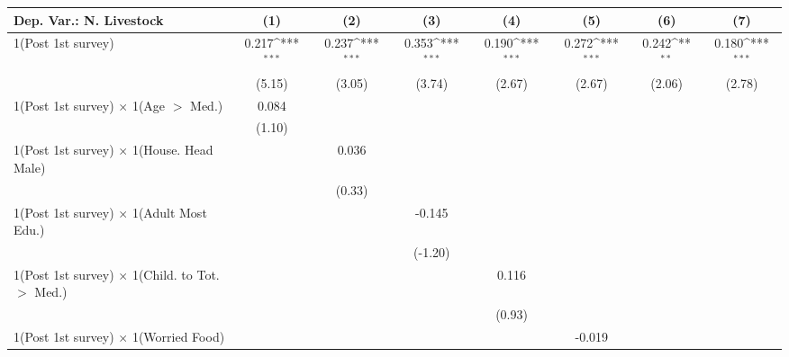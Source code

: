 {
\def\sym#1{\ifmmode^{#1}\else\(^{#1}\)\fi}
\begin{tabular*}{\hsize}{@{\hskip\tabcolsep\extracolsep\fill}l*{7}{c}}
\toprule
Dep. Var.: N. Livestock&      (1)         &      (2)         &      (3)         &      (4)         &      (5)         &      (6)         &      (7)         \\
\midrule
1(Post 1st survey)&    0.217\sym{***}&    0.237\sym{***}&    0.353\sym{***}&    0.190\sym{***}&    0.272\sym{***}&    0.242\sym{**} &    0.180\sym{***}\\
                &   (5.15)         &   (3.05)         &   (3.74)         &   (2.67)         &   (2.67)         &   (2.06)         &   (2.78)         \\
1(Post 1st survey) $\times$ 1(Age $>$ Med.)&    0.084         &                  &                  &                  &                  &                  &                  \\
                &   (1.10)         &                  &                  &                  &                  &                  &                  \\
1(Post 1st survey) $\times$ 1(House. Head Male)&                  &    0.036         &                  &                  &                  &                  &                  \\
                &                  &   (0.33)         &                  &                  &                  &                  &                  \\
1(Post 1st survey) $\times$ 1(Adult Most Edu.)&                  &                  &   -0.145         &                  &                  &                  &                  \\
                &                  &                  &  (-1.20)         &                  &                  &                  &                  \\
1(Post 1st survey) $\times$ 1(Child. to Tot. $>$ Med.)&                  &                  &                  &    0.116         &                  &                  &                  \\
                &                  &                  &                  &   (0.93)         &                  &                  &                  \\
1(Post 1st survey) $\times$ 1(Worried Food)&                  &                  &                  &                  &   -0.019         &                  &                  \\

\end{tabular*}}
